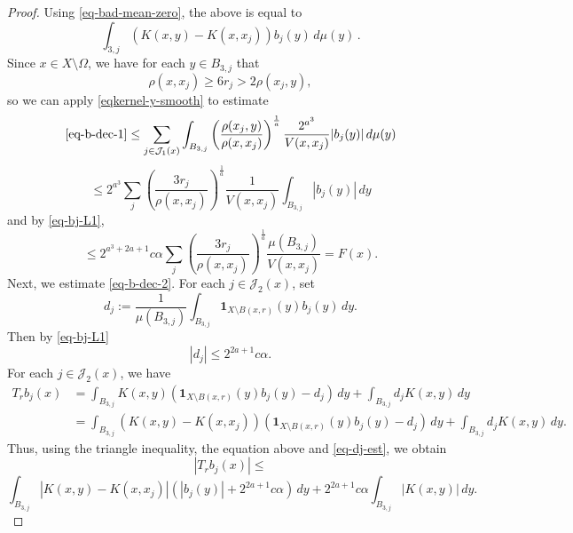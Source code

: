 \begin{proof}
Using \eqref{eq-bad-mean-zero}, the above is equal to
\begin{equation*}
    \int_{{3,j}} (K(x,y)-K(x,x_j)) b_j(y)\,d\mu(y)\,.
\end{equation*}
Since $x\in X\setminus\Omega$, we have for each $y\in B_{3,j}$ that
\begin{equation}
    \label{eq-Om-cj}
    \rho(x,x_j)\ge 6r_j > 2\rho(x_j,y),
\end{equation}
so we can apply \eqref{eqkernel-y-smooth} to estimate
\begin{equation*}
    \eqref{eq-b-dec-1} \le \sum_{j\in \mathcal{J}_1(x)}\int_{B_{3,j}}\left(\frac{\rho(x_j,y)}{\rho(x,x_j)}\right)^{\frac{1}{a}}\frac{2^{a^3}}{V(x,x_j)} |b_j(y)|\, d\mu(y)
\end{equation*}
\begin{equation}
    \le 2^{a^3} \sum_{j} \left(\frac{3r_j}{\rho(x,x_j)}\right)^{\frac{1}{a}}\frac{1}{V(x,x_j)}\int_{B_{3,j}} |b_j(y)|\, dy
\end{equation}
and by \eqref{eq-bj-L1},
\begin{equation}
    \label{eq-J1-diff-est}
    \le 2^{a^3+2a+1} c\alpha \sum_{j} \left(\frac{3r_j}{\rho(x,x_j)}\right)^{\frac{1}{a}}\frac{\mu(B_{3,j})}{V(x,x_j)} = F(x).
\end{equation}
Next, we estimate \eqref{eq-b-dec-2}. For each $j\in \mathcal{J}_2(x)$, set
\begin{equation*}
    d_j:=\frac{1}{\mu(B_{3,j})}\int_{B_{3,j}} \mathbf{1}_{X\setminus B(x,r)}(y) b_j(y)\, dy.
\end{equation*}
Then by \eqref{eq-bj-L1}
\begin{equation}
    \label{eq-dj-est}
    |d_j|\le 2^{2a+1} c\alpha.
\end{equation}
For each $j\in \mathcal{J}_2(x)$, we have
\begin{align*}
    T_r b_j(x)&=\int_{B_{3,j}} K(x,y) (\mathbf{1}_{X\setminus B(x,r)}(y)b_j(y)-d_j)\, dy + \int_{B_{3,j}} d_j K(x,y) \, dy \\
    &= \int_{B_{3,j}} (K(x,y)-K(x,x_j)) (\mathbf{1}_{X\setminus B(x,r)}(y)b_j(y)-d_j)\, dy + \int_{B_{3,j}} d_j K(x,y) \, dy.
\end{align*}
Thus, using the triangle inequality, the equation above and \eqref{eq-dj-est}, we obtain
\begin{equation*}
    |T_r b_j(x)|\le
\end{equation*}
\begin{equation}
    \label{eq-J2-diff-est}
    \int_{B_{3,j}} |K(x,y)-K(x,x_j)| \left(|b_j(y)|+2^{2a+1} c\alpha\right)\, dy +2^{2a+1} c\alpha \int_{B_{3,j}}  |K(x,y)| \, dy.

\end{equation}
\end{proof}
